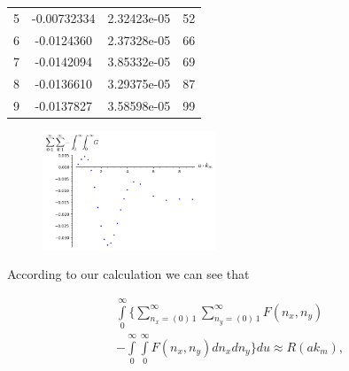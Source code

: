 \documentclass[twoside, 10pt, ptm]{article}
\begin{document}
\begin{multicols}{2}
\begin{center}
\begin{tabular}{ | l | c | c | c | }
5 & -0.00732334 & 2.32423e-05 & 52 \\
6 & -0.0124360 & 2.37328e-05 & 66 \\
7 & -0.0142094 & 3.85332e-05 & 69 \\
8 & -0.0136610 & 3.29375e-05 & 87 \\
9 & -0.0137827 & 3.58598e-05 & 99 \\
\hline
\end{tabular}
\end{center}





\begin{figure}
\begin{center}
\includegraphics[width=0.46\textwidth]{sum_sum_int_int_G_on_a_km.png}
\caption{}{}
\end{center}
\label{fig:G_on_a_km}
\end{figure}



    According to our calculation we can see that

\vspace{-3.5mm}
\begin{equation}
\begin{array}{l}
    \int\limits_{0}^{\infty} \Bigg\{ \sum\limits_{n_x=\left(0\right)\,1}^{\infty} \sum\limits_{n_y=\left(0\right)\,1}^{\infty} F\left(n_x, n_y\right) \\
- \int\limits_{0}^{\infty} \int\limits_{0}^{\infty} F\left(n_x, n_y\right) d{n_x} d{n_y} \Bigg\} d{u} \approx R\left(a k_m\right),
\end{array}
\end{equation}



\end{multicols}
\end{document}
